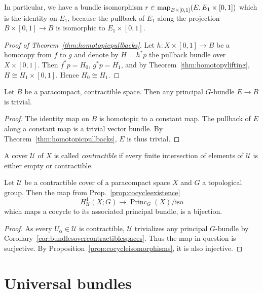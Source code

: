 \documentclass[a4paper,openany]{scrbook}
\DeclareMathOperator{\Princ}{Princ}
\begin{document}
In particular, we have a bundle isomorphism $r\in \operatorname{map}_{B \times [0,1]}(E, E_1 \times [0,1])$ which is the identity on $E_1$, because the pullback of $E_1$ along the projection $B \times [0,1] \to B$ is isomorphic to $E_1 \times [0,1]$.

\begin{proof}[Proof of Theorem~\ref{thm:homotopicpullbacks}]
Let $h\colon X \times [0,1] \to B$ be a homotopy from $f$ to $g$ and denote by $H = h^*p$ the pullback bundle over $X \times [0,1]$. Then $f^*p = H_0$, $g^*p=H_1$, and by Theorem~\ref{thm:homotopylifting}, $H \cong H_1 \times [0,1]$. Hence $H_0 \cong H_1$.
\end{proof}

\begin{corollary}\label{cor:bundlesovercontractiblespaces}
Let $B$ be a paracompact, contractible space. Then any principal $G$-bundle $E \to B$ is trivial.
\end{corollary}
\begin{proof}
The identity map on $B$ is homotopic to a constant map. The pullback of $E$ along a constant map is a trivial vector bundle. By Theorem~\ref{thm:homotopicpullbacks}, $E$ is thus trivial.
\end{proof}

\begin{defn} A cover $\mathcal U$ of $X$ is called \emph{contractible} if every finite intersection of elements of $\mathcal U$ is either empty or contractible.
\end{defn}

\begin{corollary}\label{cor:H1realizedoncontractiblecovers}
Let $\mathcal U$ be a contractible cover of a paracompact space $X$ and $G$ a topological group. Then the map from Prop.~\ref{prop:cocycleexistence}
\[
H^1_{\mathcal U}(X;G) \to \Princ_G(X)/\text{iso}
\]
which maps a cocycle to its associated principal bundle, is a bijection.
\end{corollary}
\begin{proof}
As every $U_\alpha \in \mathcal U$ is contractible, $\mathcal U$ trivializes any principal $G$-bundle by Corollary~\ref{cor:bundlesovercontractiblespaces}. Thus the map in question is surjective. By Proposition~\ref{prop:cocycleisomorphisms}, it is also injective.
\end{proof}

\section{Universal bundles}
\end{document}
